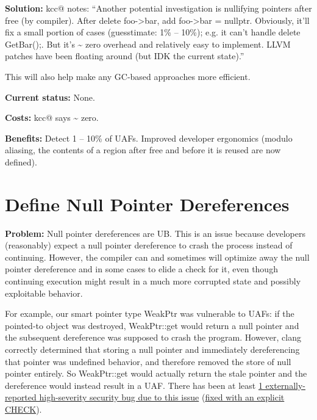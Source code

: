 \documentclass[a4paper,12pt,notitlepage,twoside,openright]{article}
\newcommand{\uline}[1]{#1}
\begin{document}
{\textbf{Solution:} kcc@ notes: ``Another potential investigation is
nullifying pointers after free (by compiler). After delete
foo-\textgreater bar, add foo-\textgreater bar = nullptr. Obviously,
it'll fix a small portion of cases (guesstimate: 1\% -- 10\%); e.g. it
can't handle delete GetBar();. But it's \textasciitilde{} zero overhead
and relatively easy to implement. LLVM patches have been floating around
(but IDK the current state).''

This will also help make any GC-based approaches more efficient.

\textbf{Current status:} None.

\textbf{Costs:} kcc@ says \textasciitilde{} zero.

\textbf{Benefits:} Detect 1 -- 10\% of UAFs. Improved developer
ergonomics (modulo aliasing, the contents of a region after free and
before it is reused are now defined).

\section{Define Null Pointer Dereferences}

\textbf{Problem:} Null pointer dereferences are UB. This is an issue
because developers (reasonably) expect a null pointer dereference to
crash the process instead of continuing. However, the compiler can and
sometimes will optimize away the null pointer dereference and in some
cases to elide a check for it, even though continuing execution might
result in a much more corrupted state and possibly exploitable behavior.

For example, our smart pointer type WeakPtr was vulnerable to UAFs: if
the pointed-to object was destroyed, WeakPtr::get would return a null
pointer and the subsequent dereference was supposed to crash the
program. However, clang correctly determined that storing a null pointer
and immediately dereferencing that pointer was undefined behavior, and
therefore removed the store of null pointer entirely.
So WeakPtr::get would actually return the stale pointer and the
dereference would instead result in a UAF. There has been at
least \href{https://www.google.com/url?q=https://bugs.chromium.org/p/chromium/issues/detail?id\%3D1133635\&sa=D\&source=editors\&ust=1631944129071000\&usg=AOvVaw0nhje5VI4xjTFlE1-QftQ3}{\uline{1
externally-reported high-severity security bug due to this
issue}} (\href{https://www.google.com/url?q=https://chromium.googlesource.com/chromium/src/\%2B/0b308a0e37b9d14a335c3b487511b7117c98d74b\&sa=D\&source=editors\&ust=1631944129071000\&usg=AOvVaw3Bagjs8VlafIjNTAqrnEZF}{\uline{fixed
with an explicit CHECK}}).

}
\end{document}
